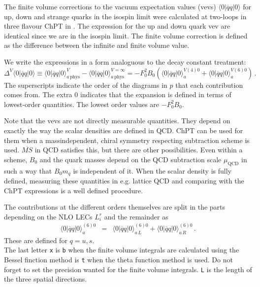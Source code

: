 \documentclass[12pt,a4paper]{article}
\newcommand{\mytt}[1]{\texttt{#1}}
\begin{document}
The finite volume corrections to the vacuum expectation values (vevs)
$\langle0\vert \overline q q \vert 0\rangle$
for up, down and strange quarks in the isospin limit
were  calculated at two-loops in three flavour ChPT
in \cite{Bijnens:2006ve}.
The expression for the up and down quark vev are identical since we
are in the isospin limit.
The finite volume correction is defined as the difference between
the infinite and finite volume value.

We write the expressions in a form analoguous to the decay constant
treatment:
\begin{equation}
\Delta^V\langle0\vert \overline q q \vert 0\rangle
\equiv
\langle0\vert \overline q q \vert 0\rangle_{a\,\mathrm{phys}}^V
-\langle0\vert \overline q q \vert 0\rangle_{a\,\mathrm{phys}}^{V=\infty}
 =
- F_0^2 B_0\left(\langle0\vert \overline q q \vert 0\rangle_a^{V(4)0}+
\langle0\vert \overline q q \vert 0\rangle_a^{V(6)0}\right)\,.
\end{equation}
The superscripts indicate the order of the diagrams in $p$ that each
contribution comes from. The extra $0$ indicates that the expansion
is defined in terms of lowest-order quantities.
The lowest order values are $-F_0^2 B_0$.

Note that the vevs are not directly measurable quantities. They depend
on exactly the way the scalar densities are defined in QCD. ChPT can be
used for them when a massindependent, chiral symmetry respecting subtraction
scheme is used. $\overline{MS}$ in QCD satisfies this, but there are other
possibilities. Even within a scheme, $B_0$ and the quark masses depend
on the QCD subtraction scale $\mu_\textrm{QCD}$ in such a way that
$B_0 m_q$ is independent of it. 
When the scalar density is fully defined, measuring these quantities in
e.g. lattice QCD and comparing with the ChPT expressions is a well defined
procedure.

The contributions at the different orders themselves are split in the parts
depending on the NLO LECs $L_i^r$ and the
remainder as
\begin{eqnarray}
\label{defvevloV}
\langle0\vert \overline q q \vert 0\rangle_a^{(6)0}&=&
\langle0\vert \overline q q \vert 0\rangle_{a\,L}^{(6)0}
+\langle0\vert \overline q q \vert 0\rangle_{a\,R}^{(6)0}\,.
\end{eqnarray}
These are defined for $q=u,s$.\\

The last letter \mytt{x} is \mytt{b} when the finite volume integrals
are calculated using the Bessel finction method is \mytt{t} when the
theta function method is used. Do not forget to set the precision wanted for
the finite volume integrals.
\mytt{L} is the length of the three spatial directions.
\end{document}
